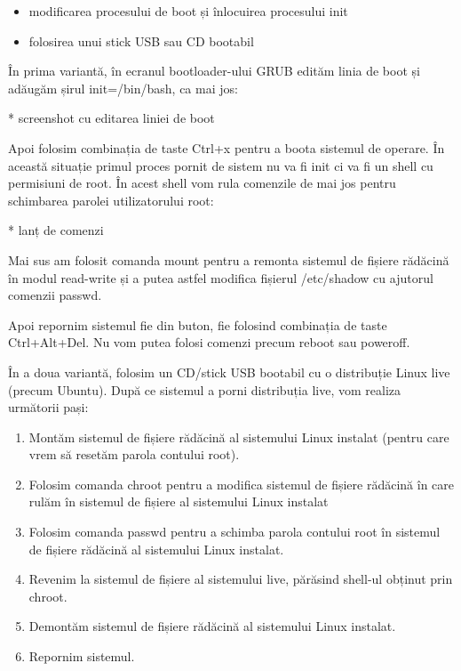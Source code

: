 \begin{itemize}
	\item modificarea procesului de boot și înlocuirea procesului init
	\item folosirea unui stick USB  sau CD
		bootabil
\end{itemize}

În prima variantă, în ecranul bootloader-ului GRUB  edităm linia de boot și
adăugăm șirul init=/bin/bash, ca mai jos:

* screenshot cu editarea liniei de boot

Apoi folosim combinația de taste Ctrl+x pentru a boota sistemul de operare. În
această situație primul proces pornit de sistem nu va fi init ci va fi un shell
cu permisiuni de root. În acest shell vom rula comenzile de mai jos pentru
schimbarea parolei utilizatorului root:

* lanț de comenzi

Mai sus am folosit comanda mount pentru a remonta sistemul de fișiere rădăcină
în modul read-write și a putea astfel modifica fișierul /etc/shadow cu ajutorul
comenzii passwd.

Apoi repornim sistemul fie din buton, fie folosind combinația de taste
Ctrl+Alt+Del. Nu vom putea folosi comenzi precum reboot sau poweroff.

În a doua variantă, folosim un CD/stick USB bootabil cu o distribuție Linux live
(precum Ubuntu). După ce sistemul a porni distribuția live, vom realiza
următorii pași:

\begin{enumerate}
	\item Montăm sistemul de fișiere rădăcină al sistemului Linux instalat
		(pentru care vrem să resetăm parola contului root).
	\item Folosim comanda chroot pentru a modifica sistemul de fișiere
		rădăcină în care rulăm în sistemul de fișiere al sistemului
		Linux instalat
	\item Folosim comanda passwd pentru a schimba parola contului root în
		sistemul de fișiere rădăcină al sistemului Linux instalat.
	\item Revenim la sistemul de fișiere al sistemului live, părăsind
		shell-ul obținut prin chroot.
	\item Demontăm sistemul de fișiere rădăcină al sistemului Linux
		instalat.
	\item Repornim sistemul.
\end{enumerate}

